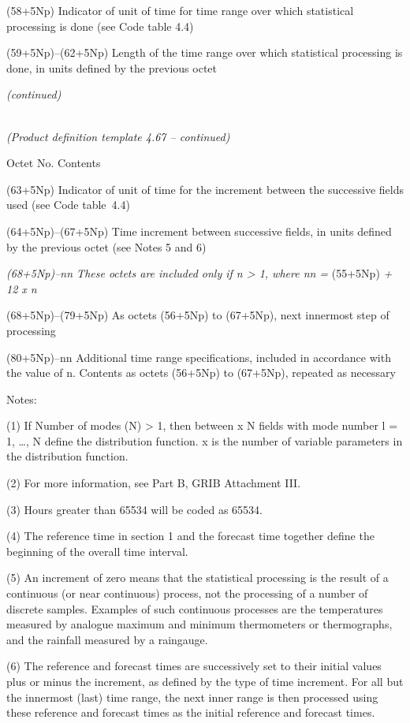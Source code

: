 (58+5Np) Indicator of unit of time for time range over which statistical processing is done (see Code table 4.4)

(59+5Np)--(62+5Np) Length of the time range over which statistical processing is done, in units defined by the previous octet

\emph{(continued)}

\emph{\\
(Product definition template 4.67 -- continued)}

Octet No. Contents

(63+5Np) Indicator of unit of time for the increment between the successive fields used (see Code table~4.4)

(64+5Np)--(67+5Np) Time increment between successive fields, in units defined by the previous octet (see Notes 5 and 6)

\emph{(68+5Np)--nn These octets are included only if n \textgreater{} 1, where nn =} (55+5Np) \emph{+ 12 x n}

(68+5Np)--(79+5Np) As octets (56+5Np) to (67+5Np), next innermost step of processing

(80+5Np)--nn Additional time range specifications, included in accordance with the value of n. Contents as octets (56+5Np) to (67+5Np), repeated as necessary

Notes:

(1) If Number of modes (N) \textgreater{} 1, then between x N fields with mode number l = 1, \ldots, N define the distribution function. x is the number of variable parameters in the distribution function.

(2) For more information, see Part B, GRIB Attachment III.

(3) Hours greater than 65534 will be coded as 65534.

(4) The reference time in section 1 and the forecast time together define the beginning of the overall time interval.

(5) An increment of zero means that the statistical processing is the result of a continuous (or near continuous) process, not the processing of a number of discrete samples. Examples of such continuous processes are the temperatures measured by analogue maximum and minimum thermometers or thermographs, and the rainfall measured by a raingauge.

(6) The reference and forecast times are successively set to their initial values plus or minus the increment, as defined by the type of time increment. For all but the innermost (last) time range, the next inner range is then processed using these reference and forecast times as the initial reference and forecast times.

